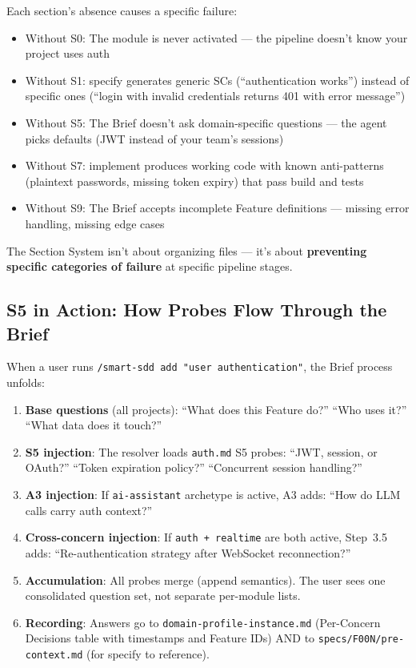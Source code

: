 \documentclass[11pt,a4paper,openright,twoside]{report}
\newcommand{\cmd}[1]{\texttt{/#1}}
\newcommand{\file}[1]{\texttt{#1}}
\begin{document}
\begin{warnbox}
Each section's absence causes a specific failure:
\begin{itemize}[nosep]
\item Without S0: The module is never activated --- the pipeline doesn't know your project uses auth
\item Without S1: specify generates generic SCs (``authentication works'') instead of specific ones (``login with invalid credentials returns 401 with error message'')
\item Without S5: The Brief doesn't ask domain-specific questions --- the agent picks defaults (JWT instead of your team's sessions)
\item Without S7: implement produces working code with known anti-patterns (plaintext passwords, missing token expiry) that pass build and tests
\item Without S9: The Brief accepts incomplete Feature definitions --- missing error handling, missing edge cases
\end{itemize}
The Section System isn't about organizing files --- it's about \textbf{preventing specific categories of failure} at specific pipeline stages.
\end{warnbox}

\subsection{S5 in Action: How Probes Flow Through the Brief}

When a user runs \cmd{smart-sdd add "user authentication"}, the Brief process unfolds:

\begin{enumerate}
  \item \textbf{Base questions} (all projects): ``What does this Feature do?'' ``Who uses it?'' ``What data does it touch?''
  \item \textbf{S5 injection}: The resolver loads \texttt{auth.md} S5 probes: ``JWT, session, or OAuth?'' ``Token expiration policy?'' ``Concurrent session handling?''
  \item \textbf{A3 injection}: If \texttt{ai-assistant} archetype is active, A3 adds: ``How do LLM calls carry auth context?''
  \item \textbf{Cross-concern injection}: If \texttt{auth + realtime} are both active, Step~3.5 adds: ``Re-authentication strategy after WebSocket reconnection?''
  \item \textbf{Accumulation}: All probes merge (append semantics). The user sees one consolidated question set, not separate per-module lists.
  \item \textbf{Recording}: Answers go to \file{domain-profile-instance.md} (Per-Concern Decisions table with timestamps and Feature IDs) AND to \file{specs/F00N/pre-context.md} (for specify to reference).
\end{enumerate}
\end{document}
